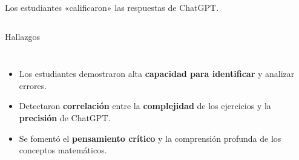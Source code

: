 
\begin{frame}
\centering
\end{frame}

\begin{frame}
\begin{columns}
\begin{block}{}
    Los estudiantes «calificaron» las respuestas de ChatGPT.
\end{block}
\centering
\end{columns}

\end{frame}


\begin{frame}{Hallazgos}
\begin{columns}
    \begin{itemize}[leftmargin=*]
        \item Los estudiantes demostraron alta \textbf{capacidad para identificar} y analizar errores.
        \item Detectaron \textbf{correlación} entre la \textbf{complejidad} de los ejercicios y la \textbf{precisión} de ChatGPT.
        \item Se fomentó el \textbf{pensamiento crítico} y la comprensión profunda de los conceptos matemáticos.
    \end{itemize}
\end{columns}
\end{frame}
